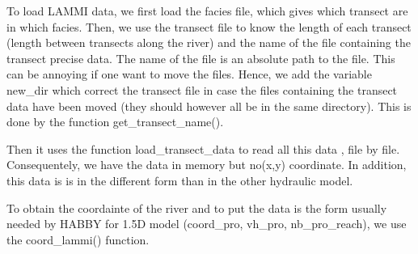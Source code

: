 \documentclass[letterpaper,10pt,english]{sphinxmanual}
\begin{document}
\begin{fulllineitems}
To load LAMMI data, we first load the facies file, which gives which transect are in which facies. Then, we use
the transect file to know the length of each transect (length between transects along the river) and the
name of the file containing the transect precise data. The name of the file is an absolute path to the file.
This can be annoying if one want to move the files. Hence, we add the variable new\_dir which correct the transect
file in case the files containing the transect data have been moved (they should however all be in the same
directory). This is done by the function get\_transect\_name().

Then it uses the function load\_transect\_data to read all this data , file by file. Consequentely, we have
the data in memory but no(x,y) coordinate. In addition, this data is is in the different form than in the other
hydraulic model.

To obtain the coordainte of the river and to put the data is the form usually needed by HABBY for 1.5D model
(coord\_pro, vh\_pro, nb\_pro\_reach), we use the coord\_lammi() function.

\end{fulllineitems}

\end{document}
